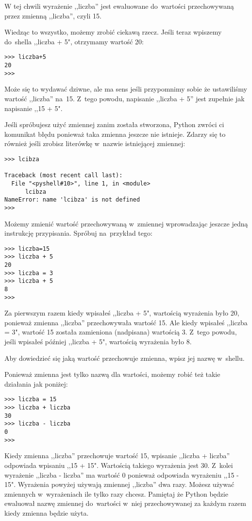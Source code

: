 \documentclass{book}
\begin{document}
W tej chwili wyrażenie ,,liczba'' jest ewaluowane do~wartości przechowywaną przez zmienną ,,liczba'', czyli 15.

Wiedząc to wszystko, możemy zrobić ciekawą rzecz. Jeśli teraz wpiszemy do~shella ,,liczba + 5", otrzymamy wartość 20:

\begin{lstlisting}
>>> liczba+5
20
>>> 
\end{lstlisting}

Może się to wydawać dziwne, ale ma sens jeśli przypomnimy sobie że ustawiliśmy wartość ,,liczba'' na~15. Z~tego powodu, napisanie ,,liczba + 5'' jest zupełnie jak napisanie ,,15 + 5".

Jeśli spróbujesz użyć zmiennej zanim została stworzona, Python zwróci ci komunikat błędu ponieważ taka zmienna jeszcze nie istnieje. Zdarzy się to również jeśli zrobisz literówkę w~nazwie istniejącej zmiennej:


\begin{lstlisting}
>>> lcibza

Traceback (most recent call last):
  File "<pyshell#10>", line 1, in <module>
      lcibza
NameError: name 'lcibza' is not defined
>>> 
\end{lstlisting}

Możemy zmienić wartość przechowywaną w~zmiennej wprowadzając jeszcze jedną instrukcję przypisania. Spróbuj na~przykład tego:

\begin{lstlisting}
>>> liczba=15
>>> liczba + 5
20
>>> liczba = 3
>>> liczba + 5
8
>>> 
\end{lstlisting}

Za pierwszym razem kiedy wpisałeś ,,liczba + 5", wartością wyrażenia było 20, ponieważ zmienna ,,liczba'' przechowywała wartość 15. Ale kiedy wpisałeś ,,liczba = 3", wartość 15 została zamieniona (nadpisana) wartością 3. Z~tego powodu, jeśli wpisałeś później ,,liczba + 5", wartością wyrażenia było 8.

Aby dowiedzieć się jaką wartość przechowuje zmienna, wpisz jej nazwę w~shellu.

Ponieważ zmienna jest tylko nazwą dla wartości, możemy robić też takie działania jak poniżej:

\begin{lstlisting}
>>> liczba = 15
>>> liczba + liczba
30
>>> liczba - liczba
0
>>> 
\end{lstlisting}

Kiedy zmienna ,,liczba'' przechowuje wartość 15, wpisanie ,,liczba + liczba'' odpowiada wpisaniu ,,15 + 15". Wartością takiego wyrażenia jest 30. Z~kolei wyrażenie ,,liczba - liczba'' ma wartość 0 ponieważ odpowiada wyrażeniu ,,15 - 15". Wyrażenia powyżej używają zmiennej ,,liczba'' dwa razy. Możesz używać zmiennych w~wyrażeniach ile tylko razy chcesz. Pamiętaj że Python będzie ewaluował nazwę zmiennej do~wartości w~niej przechowywanej za każdym razem kiedy zmienna będzie użyta.
\end{document}
